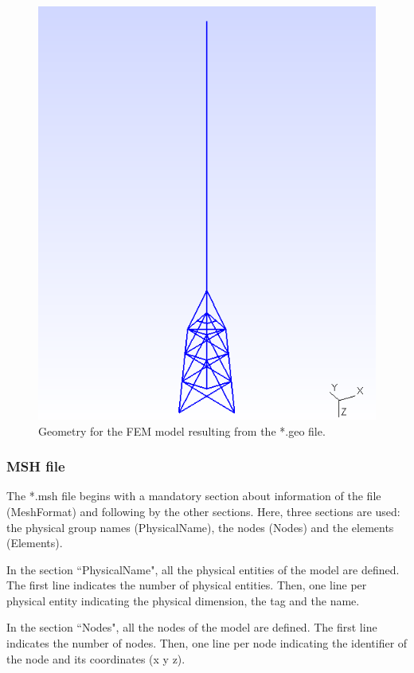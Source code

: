 \documentclass[a4]{article}
\begin{document}
\begin{figure}[tbh!]
	\centering
	\includegraphics[scale=0.6]{geo1.png}
	\caption{Geometry for the FEM model resulting from the *.geo file.}
	\label{fig:geo1}
\end{figure}

\subsubsection{MSH file}

The *.msh file begins with a mandatory section about information of the file (MeshFormat) and following by the other sections. Here, three sections are used: the physical group names (PhysicalName), the nodes (Nodes) and the elements (Elements).

In the section ``PhysicalName", all the physical entities of the model are defined. The first line indicates the number of physical entities. Then, one line per physical entity indicating the physical dimension, the tag and the name.  

In the section ``Nodes", all the nodes of the model are defined. The first line indicates the number of nodes. Then, one line per node indicating the identifier of the node and its coordinates (x y z).
\end{document}
